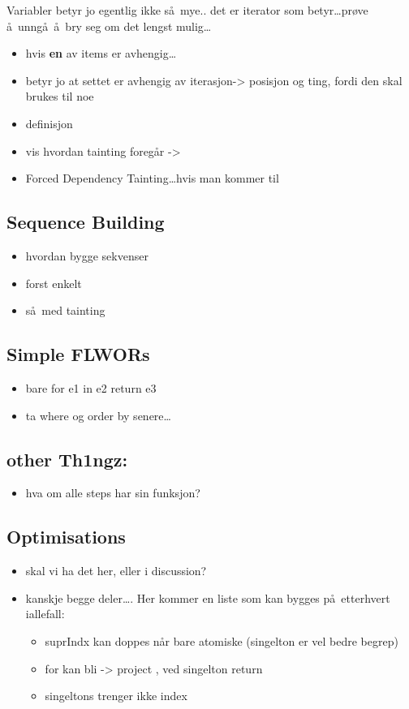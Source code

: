 Variabler betyr jo egentlig ikke s\aa~mye.. det er iterator som betyr\ldots pr\o ve
\aa~unng\aa~\aa~bry seg om det lengst mulig\ldots

\begin{itemize}
  \item hvis \textbf{en} av items er avhengig\ldots
  \item betyr jo at settet er avhengig av iterasjon-> posisjon og ting, fordi den skal brukes til noe
  \item definisjon
  \item vis hvordan tainting foreg\aa r ->
  \item Forced Dependency Tainting\ldots hvis man kommer til 
\end{itemize}

\subsection{Sequence Building}
\label{sect:trans:TD:seqBuild}
\begin{itemize}
  \item hvordan bygge sekvenser
  \item forst enkelt
  \item s\aa~med tainting
\end{itemize}

\subsection{Simple FLWORs}
\label{sect:trans:TD:simpleFLWOR}
\begin{itemize}
  \item bare for e1 in e2 return e3
  \item ta where og order by senere\ldots
\end{itemize}

\subsection{other Th1ngz:}
\begin{itemize}
  \item hva om alle steps har sin funksjon?
\end{itemize}


\subsection{Optimisations}
\label{sect:trans:optimisations}
\begin{itemize}
  \item skal vi ha det her, eller i discussion?
  \item kanskje begge deler\ldots. Her kommer en liste som kan bygges p\aa~etterhvert iallefall:
	  \begin{itemize}
	    \item suprIndx kan doppes n\aa r bare atomiske (singelton er vel bedre begrep)
	    \item for kan bli -> project , ved singelton return
	    \item singeltons trenger ikke index
	  \end{itemize} 
\end{itemize}